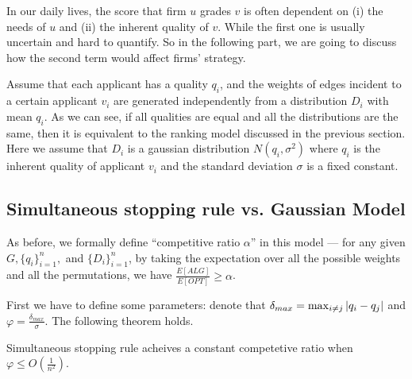 In our daily lives, the score that firm $u$ grades $v$ is often dependent
on (i) the needs of $u$ and (ii) the inherent quality of $v$. 
While the first one is usually uncertain and 
hard to quantify. So in the following part,
we are going to discuss how the second term would affect firms' strategy.

Assume that each applicant has a quality $q_i$, and the weights of edges
incident to a certain applicant $v_i$ are generated independently from
a distribution $D_i$ with mean $q_i$.
As we can see, if all qualities are equal and all the distributions 
are the same, then it is equivalent to the ranking model 
discussed in the previous section.
Here we assume that $D_i$ is a gaussian distribution $N(q_i, \sigma^2)$
where $q_i$ is the inherent quality of applicant $v_i$ and the
standard deviation $\sigma$ is a fixed constant.

\subsection{Simultaneous stopping rule vs. Gaussian Model}

As before, we formally define ``competitive ratio $\alpha$'' in this model --- for any given $G, \{q_i\}_{i=1}^n,$ and $\{D_i\}_{i=1}^n$, by taking the expectation over all the possible weights and all the permutations, we have $\frac{E[ALG]}{E[OPT]} \ge \alpha$.





First we have to define some parameters:
denote that $\delta_{max} = \max_{i \neq j} \left\vert q_i - q_j\right\vert$ and
$\varphi = \frac{\delta_{max}}{\sigma}$. The following theorem holds.

\begin{theorem}\label{normalthm}
    Simultaneous stopping rule acheives a constant competetive ratio
    when $\varphi \le O(\frac{1}{n^2})$.
\end{theorem}

